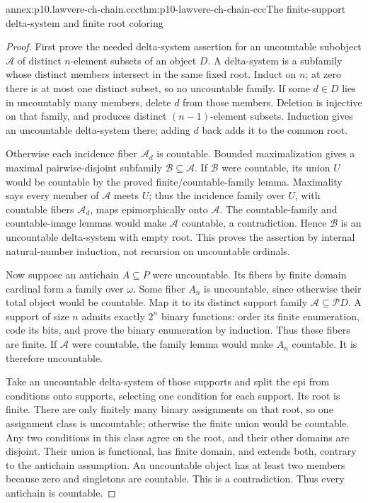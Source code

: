 \begin{annexitem}{annex:p10.lawvere-ch-chain.ccc}{thm:p10-lawvere-ch-chain-ccc}{The finite-support delta-system and finite root coloring}
\begin{proof}
First prove the needed delta-system assertion for an uncountable
subobject \(\mathcal A\) of distinct \(n\)-element subsets of an object
\(D\). A delta-system is a subfamily whose distinct members intersect
in the same fixed root. Induct on \(n\); at zero there is at most one
distinct subset, so no uncountable family.
If some \(d\in D\) lies in uncountably many members, delete \(d\)
from those members. Deletion is injective on that family, and produces
distinct \((n-1)\)-element subsets. Induction gives an uncountable
delta-system there; adding \(d\) back adds it to the common root.

Otherwise each incidence fiber \(\mathcal A_d\) is countable.
Bounded maximalization gives a maximal pairwise-disjoint subfamily
\(\mathcal B\subseteq\mathcal A\). If \(\mathcal B\) were countable,
its union \(U\) would be countable by the proved finite/countable-family
lemma. Maximality says every member of \(\mathcal A\) meets \(U\);
thus the incidence family over \(U\), with countable fibers
\(\mathcal A_d\), maps epimorphically onto \(\mathcal A\).
The countable-family and countable-image lemmas would make
\(\mathcal A\) countable, a contradiction. Hence \(\mathcal B\)
is an uncountable delta-system with empty root. This proves the
assertion by internal natural-number induction, not recursion on
uncountable ordinals.

Now suppose an antichain \(A\subseteq P\) were uncountable.
Its fibers by finite domain cardinal form a family over \(\omega\).
Some fiber \(A_n\) is uncountable, since otherwise their total object
would be countable. Map it to its distinct support family
\(\mathcal A\subseteq\mathcal P D\). A support of size \(n\) admits
exactly \(2^n\) binary functions: order its finite enumeration, code its
bits, and prove the binary enumeration by induction. Thus these fibers
are finite. If \(\mathcal A\) were countable, the family lemma would
make \(A_n\) countable. It is therefore uncountable.

Take an uncountable delta-system of those supports and split the epi from
conditions onto supports, selecting one condition for each support.
Its root is finite. There are only finitely many binary assignments on
that root, so one assignment class is uncountable; otherwise the finite
union would be countable. Any two conditions in this class agree on the
root, and their other domains are disjoint. Their union is functional,
has finite domain, and extends both, contrary to the antichain assumption.
An uncountable object has at least two members because zero and singletons
are countable. This is a contradiction. Thus every antichain is countable.


\end{proof}
\end{annexitem}
